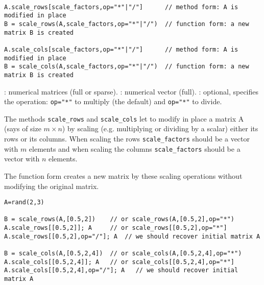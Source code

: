 \begin{mandesc}
  \\ 
\end{mandesc}
\begin{calling_sequence}
\begin{verbatim}
A.scale_rows[scale_factors,op="*"|"/"]      // method form: A is modified in place
B = scale_rows(A,scale_factors,op="*"|"/")  // function form: a new matrix B is created

A.scale_cols[scale_factors,op="*"|"/"]      // method form: A is modified in place
B = scale_cols(A,scale_factors,op="*"|"/")  // function form: a new matrix B is created
\end{verbatim}
\end{calling_sequence}
\begin{parameters}
  \begin{varlist}
    : numerical matrices (full or sparse).
    : numerical vector (full).
    : optional, specifies the operation: \verb+op="*"+ to multiply (the default)
                   and  \verb+op="*"+ to divide.
  \end{varlist}
\end{parameters}

\begin{mandescription}

The methods \verb+scale_rows+ and \verb+scale_cols+ let to modify in place a matrix A 
(says of size $m \times n$) by scaling (e.g. multiplying or dividing by a scalar) either its rows 
or its columns. When scaling the rows  \verb+scale_factors+ should be a vector with $m$ 
elements and when scaling the columns \verb+scale_factors+ should be a vector with 
$n$ elements.

The function form  creates a new matrix by these scaling operations without modifying 
the original matrix.
\end{mandescription}


\begin{examples}
\begin{Verbatim}
A=rand(2,3)

B = scale_rows(A,[0.5,2])    // or scale_rows(A,[0.5,2],op="*") 
A.scale_rows[[0.5,2]]; A     // or scale_rows[[0.5,2],op="*"] 
A.scale_rows[[0.5,2],op="/"]; A  // we should recover initial matrix A

B = scale_cols(A,[0.5,2,4])  // or scale_cols(A,[0.5,2,4],op="*") 
A.scale_cols[[0.5,2,4]]; A   // or scale_cols[[0.5,2,4],op="*"] 
A.scale_cols[[0.5,2,4],op="/"]; A   // we should recover initial matrix A
\end{Verbatim}

\end{examples}

\begin{manseealso}
\end{manseealso}

